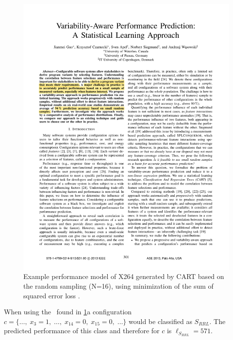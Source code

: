 \begin{figure}
	\centering
	\includegraphics[page=4,clip,trim=3.5cm 18cm 3.5cm 1.5cm, width=\linewidth]
	{Paper/VariabilityAwarePerformancePredictionAStatisticalLearningApproach.pdf}
	\caption{Example performance model of X264 generated by CART based on the random sampling (N=16), using minimization of the sum of squared error loss \cite{VariabilityAwarePerformancePredictionJianmeiSigmundApel}.}	
	\label{fig:VAPPExampleTree}	
\end{figure}
\noindent
When using the \CART~found in \cref{fig:VAPPExampleTree}a configuration $c=\{\dots,\;x_3=1,\;\dots,\;x_{14}=0,\;x_{15}=0,\;\dots\}$ would be classified as $S_{RRL}$. The predicted performance of this class and therefore for $c$ is $\ell_{S_{RRL}}=571$.
